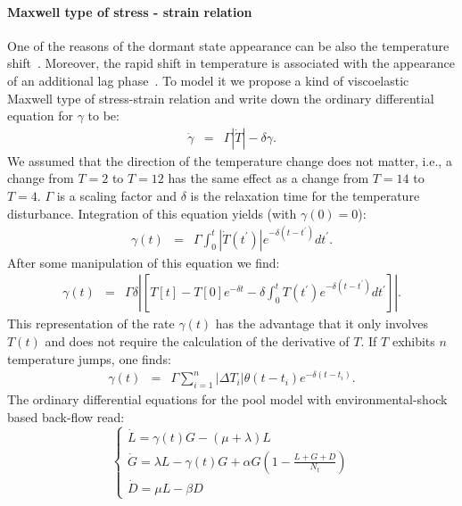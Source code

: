 \documentclass[10pt,A4paper]{article}
\numberwithin{equation}{section}
\begin{document}
\paragraph{Maxwell type of stress - strain relation}
One of the reasons of the dormant state appearance can be also the temperature shift~\cite{oliver_viable_1995}.
Moreover, the rapid shift in temperature is associated with the appearance of an additional lag phase~\cite{zwietering_modeling_1994}.
To model it we propose a kind of viscoelastic Maxwell type of stress-strain relation and write down the ordinary differential equation for $\gamma$ to be:
\begin{eqnarray}
    \dot{\gamma} &=& \Gamma \left |\dot{T}\right |-\delta \gamma.
\label{eq:rate_backlag}
\end{eqnarray}
We assumed that the direction of the temperature change does not matter, i.e., a change from $T=2$ to $T=12$ has the same effect as a change from $T=14$ to $T=4$.
$\Gamma$ is a scaling factor and $\delta$ is the relaxation time for the temperature disturbance.
Integration of this equation yields (with $\gamma(0)=0$):
\begin{eqnarray}
    \gamma(t) &=& \Gamma \int_0^t \left |\dot{T}(t^{\prime})\right |e^{-\delta (t-t^{\prime})}dt^{\prime}.
\label{eq:rate_backlag2}
\end{eqnarray}
After some manipulation of this equation we find:
\begin{eqnarray}
    \gamma(t) &=& \Gamma\delta\left |\left[T[t]-T[0]e^{-\delta t}-\delta \int_0^t T(t^{\prime})e^{-\delta (t-t^{\prime})}dt^{\prime}\right]\right |.
\label{eq:rate_backlag3}
\end{eqnarray}
This representation of the rate $\gamma(t)$ has the advantage that it only involves $T(t)$ and does not require the calculation of the derivative of $T$.
If $T$ exhibits $n$ temperature jumps, one finds:
\begin{eqnarray}
    \gamma(t) &=& \Gamma\sum_{i=1}^n \left |\Delta T_i \right |\theta(t-t_i)e^{-\delta(t-t_i)}.
\label{eq:gamma_tempshift}
\end{eqnarray}
%
The ordinary differential equations for the pool model with environmental-shock based back-flow read:
\begin{equation}
    \begin{cases}
    \dot{L} =\gamma(t) G - (\mu + \lambda) L\\
    \dot{G} = \lambda L -\gamma(t) G + \alpha G\left(1-\frac{L+G+D}{N_t}\right)\\
    \dot{D} = \mu  L - \beta D
    \end{cases}
\label{eq:ode_tempshift_backlag}
\end{equation}
\end{document}
